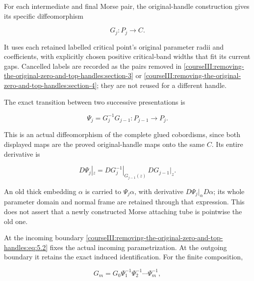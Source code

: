 \label{courseIII:removing-the-original-zero-and-top-handles:section-5}\label{courseIII:zero-top:5}

For each intermediate and final Morse pair, the original-handle construction gives its specific diffeomorphism

\begin{equation}
G_j:P_j\longrightarrow C.
 \label{courseIII:removing-the-original-zero-and-top-handles:eq:5.1}
\end{equation}

It uses each retained labelled critical point's original parameter radii and coefficients, with explicitly chosen positive critical-band widths that fit its current gaps. Cancelled labels are recorded as the pairs removed in \cref{courseIII:removing-the-original-zero-and-top-handles:section-3} or \cref{courseIII:removing-the-original-zero-and-top-handles:section-4}; they are not reused for a different handle.

The exact transition between two successive presentations is

\begin{equation}
\Psi_j=G_j^{-1}G_{j-1}:P_{j-1}\longrightarrow P_j.
 \label{courseIII:removing-the-original-zero-and-top-handles:eq:5.2}
\end{equation}

This is an actual diffeomorphism of the complete glued cobordisms, since both displayed maps are the proved original-handle maps onto the same \(C\). Its entire derivative is

\begin{equation}
D\Psi_j|_z=
 DG_j^{-1}|_{G_{j-1}(z)}\,DG_{j-1}|_z.
 \label{courseIII:removing-the-original-zero-and-top-handles:eq:5.3}
\end{equation}

An old thick embedding \(\alpha\) is carried to \(\Psi_j\alpha\), with derivative
\(D\Psi_j|_\alpha D\alpha\); its whole parameter domain and normal frame are retained through that expression. This does not assert that a newly constructed Morse attaching tube is pointwise the old one.

At the incoming boundary \eqref{courseIII:removing-the-original-zero-and-top-handles:eq:5.2} fixes the actual incoming parametrization. At the outgoing boundary it retains the exact induced identification. For the finite composition,

\begin{equation}
G_m=G_0\Psi_1^{-1}\Psi_2^{-1}\cdots\Psi_m^{-1},
 \label{courseIII:removing-the-original-zero-and-top-handles:eq:5.4}
\end{equation}

